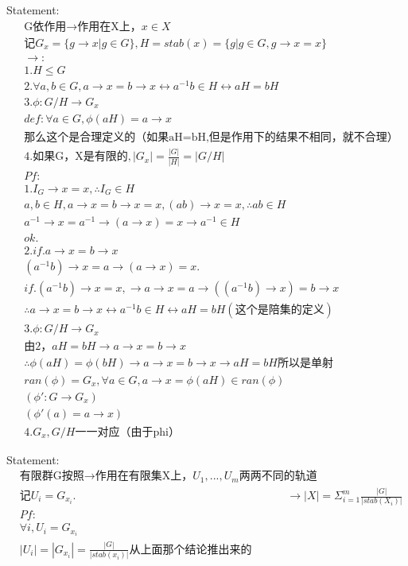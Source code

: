 \documentclass[12pt, a4paper]{article}  %
\begin{document}
Statement:
\begin{align}
    &\text{G依作用→作用在X上，}x \in X\\
    &\text{记}G_x=\{g\rightarrow x|g\in G\},H=stab(x)=\{g|g\in G,g\rightarrow x=x\}\\
    &\rightarrow:\\
    &1.H\leqslant G\\
    &2.\forall a,b\in G, a\rightarrow x=b\rightarrow x\leftrightarrow a^{-1}b\in H\leftrightarrow aH=bH\\
    &3. \phi:G/H\rightarrow G_x\\
    &def:\forall a\in G,\phi(aH)=a\rightarrow x\\
    &\text{那么这个是合理定义的（如果aH=bH,但是作用下的结果不相同，就不合理）}\\
    &4.\text{如果G，X是有限的},|G_x|=\frac{|G|}{|H|}=|G/H|\\
    &Pf:\\
    &1.I_G\rightarrow x=x,\therefore I_G\in H\\
    &a,b\in H,a\rightarrow x=b\rightarrow x=x,(ab)\rightarrow x=x,\therefore ab\in H\\
    &a^{-1}\rightarrow x=a^{-1}\rightarrow(a\rightarrow x)=x\rightarrow a^{-1}\in H\\
    &ok.\\
    &2. if. a\rightarrow x=b\rightarrow x\\
    &(a^{-1}b)\rightarrow x=a\rightarrow (a\rightarrow x)=x.\\
    &if.(a^{-1}b)\rightarrow x =x,\rightarrow a\rightarrow x=a\rightarrow((a^{-1}b)\rightarrow x)=b\rightarrow x\\
    &\therefore a\rightarrow x=b\rightarrow x\leftrightarrow a^{-1}b\in H\leftrightarrow aH=bH(\text{这个是陪集的定义})\\
    &3. \phi:G/H\rightarrow G_x\\
    &\text{由2，}aH=bH\rightarrow a\rightarrow x=b\rightarrow x\\
    &\therefore \phi(aH)=\phi(bH)\rightarrow a\rightarrow x=b\rightarrow x\rightarrow aH=bH\text{所以是单射}\\
    &ran(\phi)=G_x,\forall a\in G,a\rightarrow x=\phi(aH)\in ran(\phi)\\
    &(\phi':G\rightarrow G_x)\\
    &(\phi'(a)=a\rightarrow x)\\
    &4.G_x,G/H\text{一一对应（由于phi）}
\end{align}

Statement:
\begin{align}
    &\text{有限群G按照→作用在有限集X上，}U_1,...,U_m\text{两两不同的轨道}\\
    &\text{记} U_i=G_{x_i}.
    &\rightarrow |X|=\Sigma_{i=1}^m \frac{|G|}{|stab(X_i)|}\\
    &Pf:\\
    &\forall i,U_i=G_{x_i}\\
    &|U_i|=|G_{x_i}|=\frac{|G|}{|stab(x_i)|}\text{从上面那个结论推出来的}
\end{align}
\end{document}
